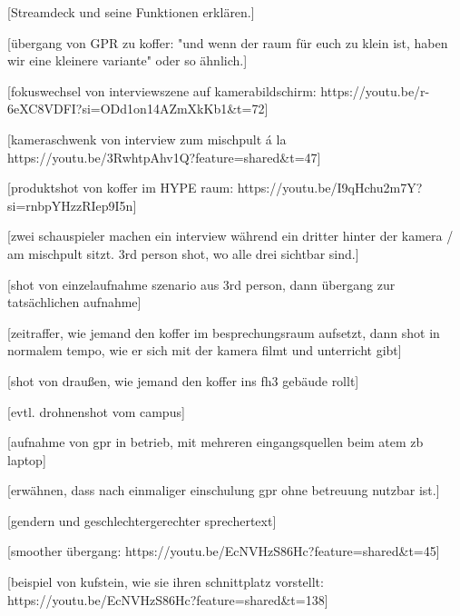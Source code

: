 \documentclass{screenplay}
\begin{document}
	[Streamdeck und seine Funktionen erklären.]
	
	[übergang von GPR zu koffer: "und wenn der raum für euch zu klein ist, haben wir eine kleinere variante" oder so ähnlich.]
	
	[fokuswechsel von interviewszene auf kamerabildschirm: https://youtu.be/r-6eXC8VDFI?si=ODd1on14AZmXkKb1\&t=72]
	
	[kameraschwenk von interview zum mischpult á la https://youtu.be/3RwhtpAhv1Q?feature=shared\&t=47]
	
	[produktshot von koffer im HYPE raum: https://youtu.be/I9qHchu2m7Y?si=rnbpYHzzRIep9I5n]
	
	[zwei schauspieler machen ein interview während ein dritter hinter der kamera / am mischpult sitzt. 3rd person shot, wo alle drei sichtbar sind.]
	
	[shot von einzelaufnahme szenario aus 3rd person, dann übergang zur tatsächlichen aufnahme]
	
	[zeitraffer, wie jemand den koffer im besprechungsraum aufsetzt, dann shot in normalem tempo, wie er sich mit der kamera filmt und unterricht gibt]
	
	[shot von draußen, wie jemand den koffer ins fh3 gebäude rollt]
	
	[evtl. drohnenshot vom campus]
	
	[aufnahme von gpr in betrieb, mit mehreren eingangsquellen beim atem zb laptop]
	
	[erwähnen, dass nach einmaliger einschulung gpr ohne betreuung nutzbar ist.]
	
	[gendern und geschlechtergerechter sprechertext]
	
	[smoother übergang: https://youtu.be/EcNVHzS86Hc?feature=shared\&t=45]
	
	[beispiel von kufstein, wie sie ihren schnittplatz vorstellt: https://youtu.be/EcNVHzS86Hc?feature=shared\&t=138]
	
	\fadeout
	\theend
\end{document}
